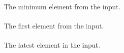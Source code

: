 The minimum element from the input.

\paragraph{}

The first element from the input.

\paragraph{}

The latest element in the input.


